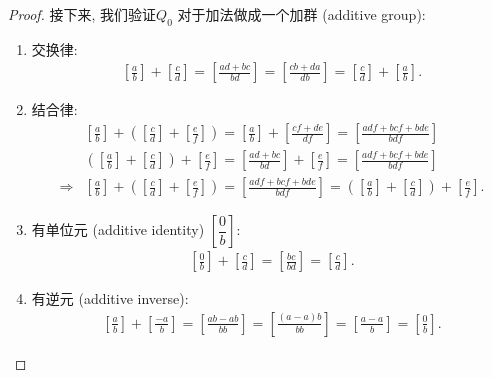 \documentclass[utf8]{ctexbook}
\theoremstyle{definition}
\begin{document}
\begin{proof}
接下来, 我们验证$Q_0$ 对于加法做成一个加群 (additive group):
\begin{enumerate}
\item{交换律:
\begin{align*}
\left[ \frac{a}{b} \right]  + \left[ \frac{c}{d} \right] = \left[ \frac{a d  + b c }{b d} \right] = \left[ \frac{c b  + d a }{d b} \right] = \left[ \frac{c}{d} \right] + \left[ \frac{a}{b} \right]   .
\end{align*}
}
\item{结合律:
\begin{align*}
& \left[ \frac{a}{b} \right] + \left(\left[ \frac{c}{d} \right] + \left[ \frac{e}{f} \right]  \right) = \left[ \frac{a}{b} \right] + \left[ \frac{cf + de  }{df} \right]  =  \left[ \frac{adf + bcf + bde  }{bdf} \right] \\
& \left( \left[ \frac{a}{b} \right] + \left[ \frac{c}{d} \right] \right) + \left[ \frac{e}{f} \right] =  \left[ \frac{a d  + b c }{b d} \right] + \left[ \frac{e}{f} \right] = \left[ \frac{a d f + b c f+ bde}{b d f} \right] \\
\Longrightarrow & \left[ \frac{a}{b} \right] + \left(\left[ \frac{c}{d} \right] + \left[ \frac{e}{f} \right]  \right) = \left[ \frac{adf + bcf + bde  }{bdf} \right] = \left( \left[ \frac{a}{b} \right] + \left[ \frac{c}{d} \right] \right) + \left[ \frac{e}{f} \right] .
\end{align*}
}
\item{有单位元 (additive identity) $ \left[ \dfrac{0}{b} \right] $:
\begin{align*}
\left[ \frac{0}{b} \right] + \left[ \frac{c}{d} \right] = \left[ \frac{b c}{b d} \right] = \left[ \frac{c}{d} \right] .
\end{align*}

}
\item{有逆元 (additive inverse):
\begin{align*}
\left[ \frac{a}{b} \right] + \left[ \frac{-a}{b} \right] = \left[ \frac{a b - a b}{b b} \right] = \left[ \frac{(a  - a) b}{b b} \right] = \left[ \frac{a  - a }{ b} \right] = \left[ \frac{0}{b} \right] .
\end{align*}
}
\end{enumerate}


\end{proof}
\end{document}

